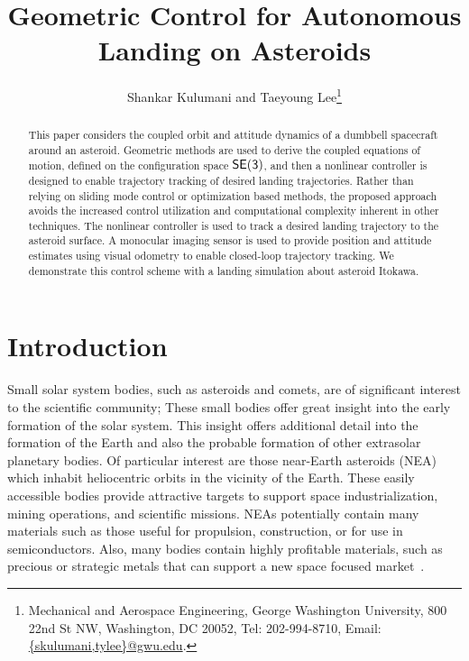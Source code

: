 \documentclass[letterpaper, paper,11pt]{AAS}		%
\begin{document}
\title{Geometric Control for Autonomous Landing on Asteroids}

\author{Shankar Kulumani and Taeyoung Lee\thanks{Mechanical and Aerospace Engineering, George Washington University, 800 22nd St NW, Washington, DC 20052, Tel: 202-994-8710, Email: \href{mailto:skulumani@gwu.edu}{\{skulumani,tylee\}@gwu.edu}.}
}


\maketitle{} 		

\begin{abstract}
    This paper considers the coupled orbit and attitude dynamics of a dumbbell spacecraft around an asteroid. 
    Geometric methods are used to derive the coupled equations of motion, defined on the configuration space \(\mathsf{SE(3)}\), and then a nonlinear controller is designed to enable trajectory tracking of desired landing trajectories.
    Rather than relying on sliding mode control or optimization based methods, the proposed approach avoids the increased control utilization and computational complexity inherent in other techniques.
    The nonlinear controller is used to track a desired landing trajectory to the asteroid surface. 
    A monocular imaging sensor is used to provide position and attitude estimates using visual odometry to enable closed-loop trajectory tracking.
    We demonstrate this control scheme with a landing simulation about asteroid Itokawa.
\end{abstract}

\section{Introduction}\label{sec:introduction}
Small solar system bodies, such as asteroids and comets, are of significant interest to the scientific community; These small bodies offer great insight into the early formation of the solar system.
This insight offers additional detail into the formation of the Earth and also the probable formation of other extrasolar planetary bodies.
Of particular interest are those near-Earth asteroids (NEA) which inhabit heliocentric orbits in the vicinity of the Earth.
These easily accessible bodies provide attractive targets to support space industrialization, mining operations, and scientific missions.
NEAs potentially contain many materials such as those useful for propulsion, construction, or for use in semiconductors.
Also, many bodies contain highly profitable materials, such as precious or strategic metals that can support a new space focused market~\cite{ross2001}.
\end{document}
